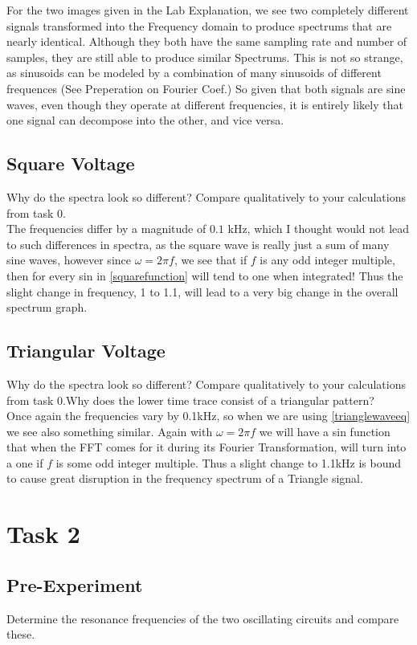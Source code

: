 \documentclass{article}
\begin{document}
For the two images given in the Lab Explanation, we see two completely different signals transformed into the Frequency domain to produce spectrums that are nearly identical. Although they both have the same sampling rate and number of samples, they are still able to produce similar Spectrums. This is not so strange, as sinusoids can be modeled by a combination of many sinusoids of different frequences (See Preperation on Fourier Coef.) So given that both signals are sine waves, even though they operate at different frequencies, it is entirely likely that one signal can decompose into the other, and vice versa.
\\
\subsection{Square Voltage}
Why do the spectra look so different? Compare qualitatively to your calculations from task 0.
\\
The frequencies differ by a magnitude of $0.1$ kHz, which I thought would not lead to such differences in spectra, as the square wave is really just a sum of many sine waves, however since $\omega = 2\pi f$, we see that if $f$ is any odd integer multiple, then for every sin in \ref{squarefunction} will tend to one when integrated! Thus the slight change in frequency, 1 to 1.1, will lead to a very big change in the overall spectrum graph.


\subsection{Triangular Voltage}
Why do the spectra look so different? Compare qualitatively to your calculations from task 0.Why does the lower time trace consist of a triangular pattern? \\
Once again the frequencies vary by 0.1kHz, so when we are using \ref{trianglewaveeq} we see also something similar. Again with $\omega = 2\pi f$ we will have a sin function that when the FFT comes for it during its Fourier Transformation, will turn into a one if $f$ is some odd integer multiple. Thus a slight change to 1.1kHz is bound to cause great disruption in the frequency spectrum of a Triangle signal.
\section{Task 2}
\subsection{Pre-Experiment}
Determine the resonance frequencies of the two oscillating circuits and compare these.
\end{document}
